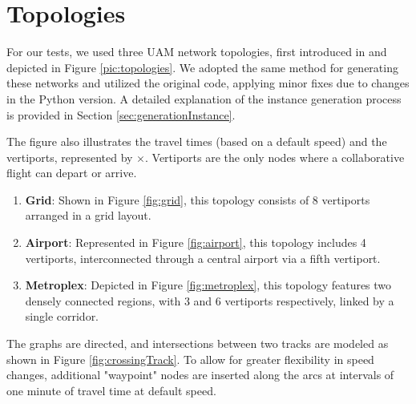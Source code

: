 \documentclass[../../thesis.tex]{subfiles}
\begin{document}
\section{Topologies}\label{sec:topologies}
For our tests, we used three UAM network topologies, first introduced in \cite{pelegrin-2023} and depicted in Figure \ref{pic:topologies}.  
We adopted the same method for generating these networks and utilized the 
original code, 
applying minor fixes due to changes in the Python version.
A detailed explanation of the instance generation process is provided in Section \ref{sec:generationInstance}.  

The figure also illustrates the travel times (based on a default speed) and the vertiports, represented by $\times$.  
Vertiports are the only nodes where a collaborative flight can depart or arrive.  

\begin{enumerate}
    \item \textbf{Grid}: Shown in Figure \ref{fig:grid}, this topology consists of 8 vertiports arranged in a grid layout.
    \item \textbf{Airport}: Represented in Figure \ref{fig:airport}, this topology includes 4 vertiports, interconnected through a central airport via a fifth vertiport.
    \item \textbf{Metroplex}: Depicted in Figure \ref{fig:metroplex}, this topology features two densely connected regions, with 3 and 6 vertiports respectively, linked by a single corridor.
\end{enumerate}

The graphs are directed, and intersections between two tracks are modeled as shown in Figure \ref{fig:crossingTrack}.  
To allow for greater flexibility in speed changes, additional "waypoint" nodes are inserted along the arcs at intervals of one minute of travel time at default speed.
\end{document}
